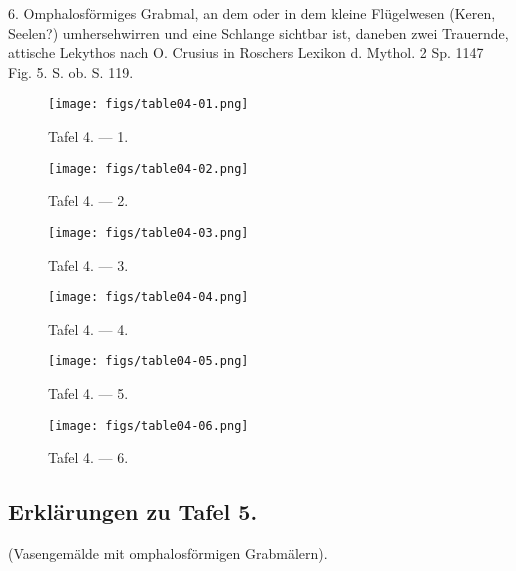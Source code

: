\documentclass[a4paper, 11pt, oneside]{article}
\begin{document}
6. Omphalosförmiges Grabmal, an dem oder in dem kleine Flügelwesen (Keren, Seelen?) umhersehwirren und eine Schlange sichtbar ist, daneben zwei Trauernde, attische Lekythos nach O. Crusius in Roschers Lexikon d. Mythol. 2 Sp. 1147 Fig. 5. S. ob. S. 119.
\clearpage
\begin{landscape}
\vspace*{\fill}
\begin{figure}[H]
\centering
\texttt{[image: figs/table04-01.png]}
\caption{Tafel 4. --- 1.}
\end{figure}
\vspace*{\fill}
\clearpage
\vspace*{\fill}
\begin{figure}[H]
\centering
\texttt{[image: figs/table04-02.png]}
\caption{Tafel 4. --- 2.}
\end{figure}
\vspace*{\fill}
\clearpage
\vspace*{\fill}
\begin{figure}[H]
\centering
\texttt{[image: figs/table04-03.png]}
\caption{Tafel 4. --- 3.}
\end{figure}
\vspace*{\fill}
\clearpage
\vspace*{\fill}
\begin{figure}[H]
\centering
\texttt{[image: figs/table04-04.png]}
\caption{Tafel 4. --- 4.}
\end{figure}
\vspace*{\fill}
\clearpage
\vspace*{\fill}
\begin{figure}[H]
\centering
\texttt{[image: figs/table04-05.png]}
\caption{Tafel 4. --- 5.}
\end{figure}
\vspace*{\fill}
\clearpage
\end{landscape}
\vspace*{\fill}
\begin{figure}[H]
\centering
\texttt{[image: figs/table04-06.png]}
\caption{Tafel 4. --- 6.}
\end{figure}
\vspace*{\fill}
\clearpage
\subsection{Erklärungen zu Tafel 5.}
\begin{center}
(Vasengemälde mit omphalosförmigen Grabmälern).
\end{center}
\end{document}
